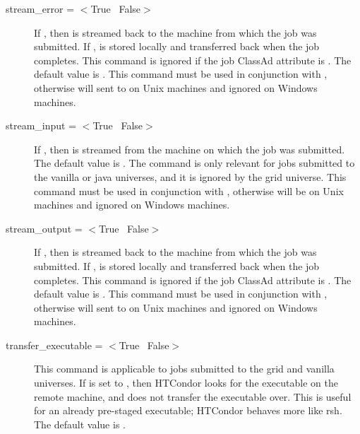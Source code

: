 \begin{description}
\label{man-condor-submit-stream-error}
\item[stream\_error = $<$True \Bar\ False$>$]
If , then  is streamed back to
the machine from which the job was submitted.
If ,  is stored locally
and transferred back when the job completes.
This command is ignored if the job ClassAd attribute
 is
.
The default value is .
This command must be used in conjunction with 
, otherwise  will
sent to  on Unix machines and
ignored on Windows machines.

\label{man-condor-submit-stream-input}
\item[stream\_input = $<$True \Bar\ False$>$]
If , then  is streamed from the
machine on which the job was submitted.
The default value is .
The command is only relevant for jobs submitted to
the vanilla or java universes, and
it is ignored by the grid
universe.
This command must be used in conjunction with 
, otherwise  will
be  on Unix machines and
ignored on Windows machines.

\label{man-condor-submit-stream-output}
\item[stream\_output = $<$True \Bar\ False$>$]
If , then  is streamed back to
the machine from which the job was submitted.
If ,  is stored locally
and transferred back when the job completes.
This command is ignored if the job ClassAd attribute
 is
.
The default value is .
This command must be used in conjunction with 
, otherwise  will
sent to  on Unix machines and
ignored on Windows machines.


\label{man-condor-submit-transfer-executable}
\item[transfer\_executable = $<$True \Bar\ False$>$]
This command is applicable to jobs submitted to the grid
and vanilla universes.
If  is set to
, then HTCondor looks for the executable on the remote machine, and
does not transfer the executable over.
This is useful for an already pre-staged 
executable; HTCondor behaves more like rsh.
The default value is .


\end{description}
